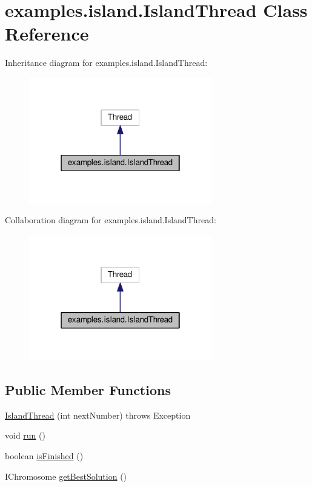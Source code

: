 \hypertarget{classexamples_1_1island_1_1_island_thread}{\section{examples.\-island.\-Island\-Thread Class Reference}
\label{classexamples_1_1island_1_1_island_thread}
}


Inheritance diagram for examples.\-island.\-Island\-Thread\-:
\nopagebreak
\begin{figure}[H]
\begin{center}
\leavevmode
\includegraphics[width=226pt]{classexamples_1_1island_1_1_island_thread__inherit__graph}
\end{center}
\end{figure}


Collaboration diagram for examples.\-island.\-Island\-Thread\-:
\nopagebreak
\begin{figure}[H]
\begin{center}
\leavevmode
\includegraphics[width=226pt]{classexamples_1_1island_1_1_island_thread__coll__graph}
\end{center}
\end{figure}
\subsection*{Public Member Functions}
\begin{DoxyCompactItemize}
\item 
\hyperlink{classexamples_1_1island_1_1_island_thread_aa669a276a797f7b849fcaa20297b7a79}{Island\-Thread} (int next\-Number)  throws Exception 
\item 
void \hyperlink{classexamples_1_1island_1_1_island_thread_aa8369d43aaf78f16b1960c7564bc593d}{run} ()
\item 
boolean \hyperlink{classexamples_1_1island_1_1_island_thread_aa018a0efc2d8466969cb6a08acdc147f}{is\-Finished} ()
\item 
I\-Chromosome \hyperlink{classexamples_1_1island_1_1_island_thread_ad61df00d09223ae03957d3af6da3ee17}{get\-Best\-Solution} ()
\end{DoxyCompactItemize}
